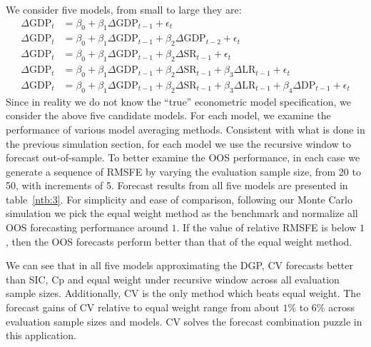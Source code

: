 We consider five models, from small to large they are:
\begin{subequations}
\begin{align}
\Delta\mathrm{GDP}_{t} & = \beta_{0} + \beta_{1}\Delta\mathrm{GDP}_{t-1} + \epsilon_{t} \label{md:1}\\
\Delta\mathrm{GDP}_{t} & = \beta_{0} + \beta_{1}\Delta\mathrm{GDP}_{t-1} + \beta_{2}\Delta\mathrm{GDP}_{t-2} + \epsilon_{t}\label{md:2} \\
\Delta\mathrm{GDP}_{t} & = \beta_{0} + \beta_{1}\Delta\mathrm{GDP}_{t-1} + \beta_{2}\Delta\mathrm{SR}_{t-1} + \epsilon_{t}\label{md:3} \\
\Delta\mathrm{GDP}_{t} & = \beta_{0} + \beta_{1}\Delta\mathrm{GDP}_{t-1} + \beta_{2}\Delta\mathrm{SR}_{t-1} + \beta_{3}\Delta\mathrm{LR}_{t-1} + \epsilon_{t}\label{md:4} \\
\Delta\mathrm{GDP}_{t} & = \beta_{0} + \beta_{1}\Delta\mathrm{GDP}_{t-1} + \beta_{2}\Delta\mathrm{SR}_{t-1} + \beta_{3}\Delta\mathrm{LR}_{t-1} + \beta_{4}\Delta\mathrm{DP}_{t-1} + \epsilon_{t}\label{md:5}
\end{align}
\end{subequations}
Since in reality we do not know the ``true'' econometric model specification, we consider the above five candidate models. For each model, we examine the performance of various model averaging methods. Consistent with what is done in the previous simulation section, for each model we use the recursive window to forecast out-of-sample. To better examine the OOS performance, in each case we generate a sequence of RMSFE by varying the evaluation sample size, from 20 to 50, with increments of 5. Forecast results from all five models are presented in table~\ref{ntb:3}. For simplicity and ease of comparison, following our Monte Carlo simulation we pick the equal weight method as the benchmark and normalize all OOS forecasting performance around $1$. If the value of relative RMSFE is below $1$, then the OOS forecasts perform better than that of the equal weight method.

We can see that in all five models approximating the DGP, CV forecasts better than SIC, Cp and equal weight under recursive window across all evaluation sample sizes. Additionally, CV is the only method which beats equal weight. The forecast gains of CV relative to equal weight range from about $1\%$ to $6\%$ across evaluation sample sizes and models. CV solves the forecast combination puzzle in this application.

